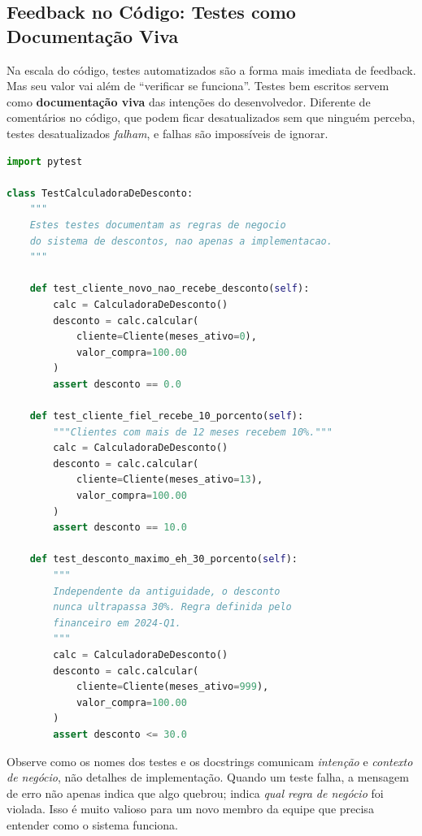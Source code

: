 \subsection{Feedback no Código: Testes como Documentação Viva}

Na escala do código, testes automatizados são a forma mais imediata de
feedback. Mas seu valor vai além de ``verificar se funciona''. Testes
bem escritos servem como \textbf{documentação viva} das intenções do
desenvolvedor. Diferente de comentários no código, que podem ficar
desatualizados sem que ninguém perceba, testes desatualizados
\emph{falham}, e falhas são impossíveis de ignorar.

\begin{lstlisting}[language=Python, caption={Testes como documentação de comportamento esperado}]
import pytest

class TestCalculadoraDeDesconto:
    """
    Estes testes documentam as regras de negocio
    do sistema de descontos, nao apenas a implementacao.
    """

    def test_cliente_novo_nao_recebe_desconto(self):
        calc = CalculadoraDeDesconto()
        desconto = calc.calcular(
            cliente=Cliente(meses_ativo=0),
            valor_compra=100.00
        )
        assert desconto == 0.0

    def test_cliente_fiel_recebe_10_porcento(self):
        """Clientes com mais de 12 meses recebem 10%."""
        calc = CalculadoraDeDesconto()
        desconto = calc.calcular(
            cliente=Cliente(meses_ativo=13),
            valor_compra=100.00
        )
        assert desconto == 10.0

    def test_desconto_maximo_eh_30_porcento(self):
        """
        Independente da antiguidade, o desconto
        nunca ultrapassa 30%. Regra definida pelo
        financeiro em 2024-Q1.
        """
        calc = CalculadoraDeDesconto()
        desconto = calc.calcular(
            cliente=Cliente(meses_ativo=999),
            valor_compra=100.00
        )
        assert desconto <= 30.0
\end{lstlisting}

Observe como os nomes dos testes e os docstrings comunicam \emph{intenção}
e \emph{contexto de negócio}, não detalhes de implementação. Quando um
teste falha, a mensagem de erro não apenas indica que algo quebrou;
indica \emph{qual regra de negócio} foi violada. Isso é muito
valioso para um novo membro da equipe que precisa entender como o sistema
funciona.

